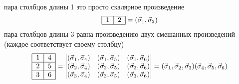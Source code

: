 \documentclass[]{article}
\begin{document}
пара столбцов длины 1 это просто скалярное произведение
$$\begin{tabular}{ |l|l| }
\hline
1 & 2 \\
\hline
\end{tabular}
= (\vec \sigma_1, \vec \sigma_2)
$$
пара столбцов длины 3 равна произведению двух смешанных произведений (каждое соответствует  своему столбцу)
$$ \begin{tabular}{ |l|l| }
\hline
1 & 4 \\ \hline
2 & 5\\ \hline
3 & 6\\
\hline
\end{tabular}
= 
\begin{vmatrix}
(\vec\sigma_1,\vec\sigma_4) & (\vec\sigma_1,\vec\sigma_5) & (\vec\sigma_1,\vec\sigma_6) \\
(\vec\sigma_2,\vec\sigma_4) & (\vec\sigma_2,\vec\sigma_5) & (\vec\sigma_2,\vec\sigma_6) \\
(\vec\sigma_3,\vec\sigma_4) & (\vec\sigma_3,\vec\sigma_5) & (\vec\sigma_3,\vec\sigma_6) \\
\end{vmatrix}
=
(\vec \sigma_1, \vec \sigma_2, \vec \sigma_3)
(\vec \sigma_4, \vec \sigma_5, \vec \sigma_6)
$$
\end{document}
